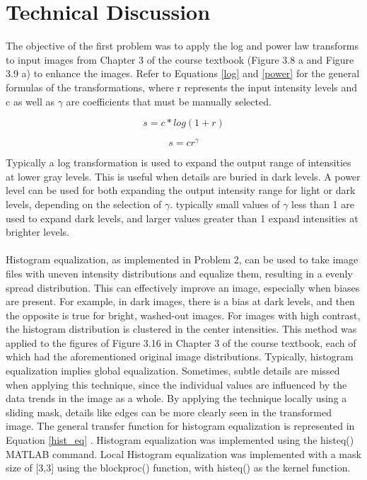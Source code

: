 \documentclass[./rarnold_report2.tex]{subfiles}
\begin{document}
\clearpage

\section*{Technical Discussion}

\noindent The objective of the first problem was to apply the log and power law transforms to input images from Chapter 3 of the course textbook (Figure 3.8 a and Figure 3.9 a) to enhance the images.  Refer to Equations \eqref{log} and \eqref{power} for the general formulas of the transformations, where r represents the input intensity levels and c as well as $\gamma$ are coefficients that must be manually selected.

\begin{equation}
\label{log}
s = c*log(1 + r)
\end{equation}

\begin{equation}
\label{power}
s = cr^{\gamma}
\end{equation}

\noindent Typically a log transformation is used to expand the output range of intensities at lower gray levels.  This is useful when details are buried in dark levels.  A power level can be used for both expanding the output intensity range for light or dark levels, depending on the selection of $\gamma$.  typically small values of $\gamma$ less than 1 are used to expand dark levels, and larger values greater than 1 expand intensities at brighter levels. 
\\ \\
\noindent Histogram equalization, as implemented in Problem 2, can be used to take image files with uneven intensity distributions and equalize them, resulting in a evenly spread distribution. This can effectively improve an image, especially when biases are present.  For example, in dark images, there is a bias at dark levels, and then the opposite is true for bright, washed-out images.  For images with high contrast, the histogram distribution is clustered in the center intensities.  This method was applied to the figures of Figure 3.16 in Chapter 3 of the course textbook, each of which had the aforementioned original image distributions.  Typically, histogram equalization implies global equalization.  Sometimes, subtle details are missed when applying this technique, since the individual values are influenced by the data trends in the image as a whole.  By applying the technique locally using a sliding mask, details like edges can be more clearly seen in the transformed image.  The general transfer function for histogram equalization is represented in Equation \eqref{hist_eq} .  Histogram equalization was implemented using the histeq() MATLAB command.  Local Histogram equalization was implemented with a mask size of [3,3] using the blockproc() function, with histeq() as the kernel function.  
\end{document}
